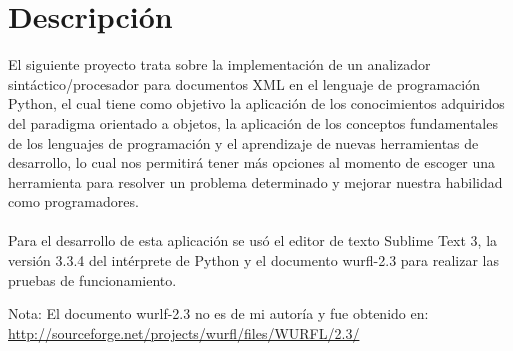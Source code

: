 \documentclass[../main.tex]{subfiles}
\begin{document}
\section{Descripción}
El siguiente proyecto trata sobre la implementación de un analizador sintáctico/procesador para documentos XML en el lenguaje de programación Python, el cual tiene como objetivo la aplicación de los conocimientos adquiridos del paradigma orientado a objetos, la aplicación de los conceptos fundamentales de los lenguajes de programación y el aprendizaje de nuevas herramientas de desarrollo, lo cual nos permitirá tener más opciones al momento de escoger una herramienta para resolver un problema determinado y mejorar nuestra habilidad como programadores.

\paragraph{ }
Para el desarrollo de esta aplicación se usó el editor de texto Sublime Text 3, la versión 3.3.4 del intérprete de Python y el documento wurfl-2.3 para realizar las pruebas de funcionamiento.

Nota: El documento wurlf-2.3 no es de mi autoría y fue obtenido en: \url{http://sourceforge.net/projects/wurfl/files/WURFL/2.3/}
\end{document}
